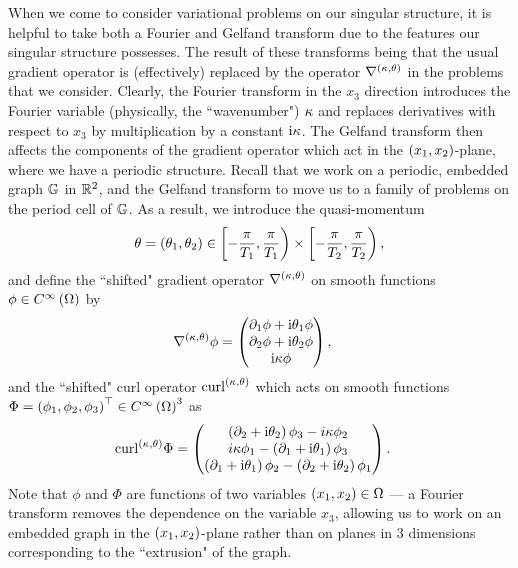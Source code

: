 When we come to consider variational problems on our singular structure, it is helpful to take both a Fourier and Gelfand transform due to the features our singular structure possesses.
The result of these transforms being that the usual gradient operator is (effectively) replaced by the operator $\nabla^{\left( \kappa, \theta \right)}$ in the problems that we consider.
Clearly, the Fourier transform in the $x_3$ direction introduces the Fourier variable (physically, the ``wavenumber") $\kappa$ and replaces derivatives with respect to $x_3$ by multiplication by a constant $\mathrm{i}\kappa$.
The Gelfand transform then affects the components of the gradient operator which act in the $\left( x_1,x_2 \right)$-plane, where we have a periodic structure.
Recall that we work on a periodic, embedded graph $\mathbb{G}$ in $\mathbb{R}^2$, and the Gelfand transform to move us to a family of problems on the period cell of $\mathbb{G}$.
As a result, we introduce the quasi-momentum
\begin{align*}
	\theta=\left( \theta_1,\theta_2 \right)\in\left[-\frac{\pi}{T_1},\frac{\pi}{T_1}\right)\times\left[-\frac{\pi}{T_2},\frac{\pi}{T_2}\right),
\end{align*}
and define the ``shifted" gradient operator $\nabla^{\left( \kappa, \theta \right)}$ on smooth functions $\phi\in C^{\infty}\left( \Omega \right)$ by
\begin{align*}
	\nabla^{\left( \kappa, \theta \right)}\phi &= \begin{pmatrix} \partial_1\phi + \mathrm{i}\theta_1\phi \\ \partial_2\phi + \mathrm{i}\theta_2\phi \\ \mathrm{i}\kappa\phi \end{pmatrix},
\end{align*}
and the ``shifted" curl operator $\mathrm{curl}_{}^{\left( \kappa, \theta \right)}$ which acts on smooth functions $\Phi=\left( \phi_1, \phi_2, \phi_3 \right)^{\top}\in C^{\infty}\left( \Omega \right)^3$ as
\begin{align*}
	\mathrm{curl}_{}^{\left( \kappa, \theta \right)}\Phi &= \begin{pmatrix} \left( \partial_2 + \mathrm{i}\theta_2 \right)\phi_3 - i\kappa\phi_2 \\ i\kappa\phi_1 - \left( \partial_1 + \mathrm{i}\theta_1 \right)\phi_3 \\ \left( \partial_1 + \mathrm{i}\theta_1 \right)\phi_2 - \left( \partial_2 + \mathrm{i}\theta_2 \right)\phi_1 \end{pmatrix}.
\end{align*}
Note that $\phi$ and $\Phi$ are functions of two variables $\left( x_1,x_2 \right)\in\Omega$ --- a Fourier transform removes the dependence on the variable $x_3$, allowing us to work on an embedded graph in the $\left( x_1,x_2 \right)$-plane rather than on planes in 3 dimensions corresponding to the ``extrusion" of the graph.